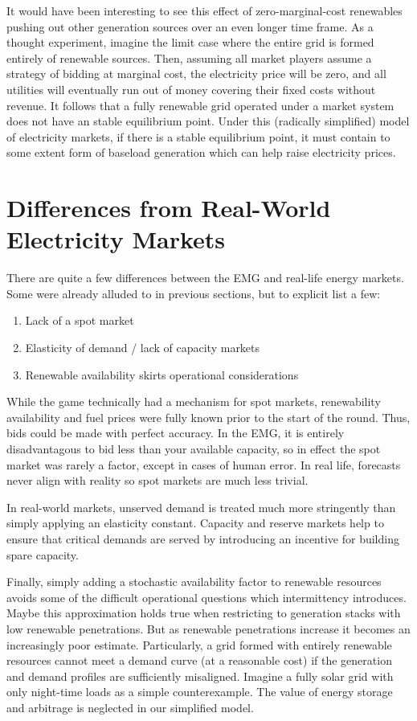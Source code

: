 \documentclass[journal,11pt]{IEEEtran}
\begin{document}
It would have been interesting to see this effect of zero-marginal-cost renewables pushing out other generation sources over an even longer time frame. As a thought experiment,
imagine the limit case where the entire grid is formed entirely of renewable sources. Then, assuming all market players assume a strategy of bidding at marginal cost, the electricity
price will be zero, and all utilities will eventually run out of money covering their fixed costs without revenue. It follows that a fully renewable grid operated under a market system
does not have an stable equilibrium point. Under this (radically simplified) model of electricity markets, if there is a stable equilibrium point, it must contain to some extent form of
baseload generation which can help raise electricity prices.

\section{Differences from Real-World Electricity Markets}

There are quite a few differences between the EMG and real-life energy markets. Some were already alluded to in previous sections, but to explicit list a few:
\begin{enumerate}
  \item Lack of a spot market
  \item Elasticity of demand / lack of capacity markets
  \item Renewable availability skirts operational considerations
\end{enumerate} 

While the game technically had a mechanism for spot markets, renewability availability and fuel prices were fully known prior to the start of the round. Thus,
bids could be made with perfect accuracy. In the EMG, it is entirely disadvantagous to bid less than your available capacity, so in effect the spot 
market was rarely a factor, except in cases of human error.  In real life, forecasts never align with reality so spot markets are much less trivial.

In real-world markets, unserved demand is treated much more stringently than simply applying an elasticity constant. Capacity and reserve markets help to ensure
that critical demands are served by introducing an incentive for building spare capacity.

Finally, simply adding a stochastic availability factor to renewable resources avoids some of the difficult operational questions which intermittency introduces. Maybe this approximation
holds true when restricting to generation stacks with low renewable penetrations. But as renewable penetrations increase it becomes an increasingly poor estimate. Particularly, a
grid formed with entirely renewable resources cannot meet a demand curve (at a reasonable cost) if the generation and demand profiles are sufficiently misaligned. Imagine a fully solar
grid with only night-time loads as a simple counterexample. The value of energy storage and arbitrage is neglected in our simplified model.
\end{document}
